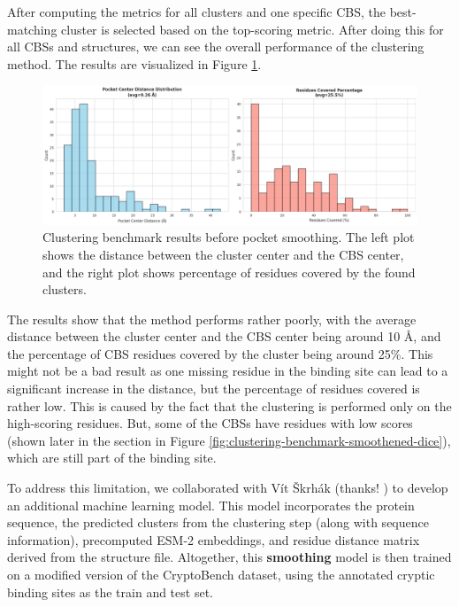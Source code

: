 After computing the metrics for all clusters and one specific CBS, the best-matching cluster is selected based on the top-scoring metric. After doing this for all CBSs and structures, we can see the overall performance of the clustering method. The results are visualized in Figure \ref{fig:clustering-benchmark}.

\begin{figure}[htbp]
    \centering
    \includegraphics[width=\textwidth]{img/non-smoothened-1.png}
    \caption{Clustering benchmark results before pocket smoothing. The left plot shows the distance between the cluster center and the CBS center, and the right plot shows percentage of residues covered by the found clusters.}
    \label{fig:clustering-benchmark}
\end{figure}

The results show that the method performs rather poorly, with the average distance between the cluster center and the CBS center being around 10 \AA, and the percentage of CBS residues covered by the cluster being around 25\%. This might not be a bad result as one missing residue in the binding site can lead to a significant increase in the distance, but the percentage of residues covered is rather low. This is caused by the fact that the clustering is performed only on the high-scoring residues. But, some of the CBSs have residues with low scores (shown later in the section in Figure \ref{fig:clustering-benchmark-smoothened-dice}), which are still part of the binding site.

To address this limitation, we collaborated with Vít Škrhák (thanks! ) to develop an additional machine learning model. This model incorporates the protein sequence, the predicted clusters from the clustering step (along with sequence information), precomputed ESM-2 embeddings, and residue distance matrix derived from the structure file. Altogether, this \textbf{smoothing} model is then trained on a modified version of the CryptoBench dataset, using the annotated cryptic binding sites as the train and test set.

